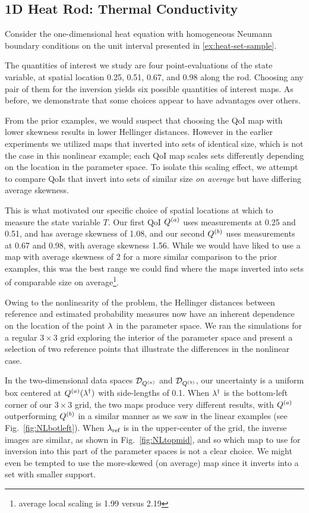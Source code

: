 \subsection{1D Heat Rod: Thermal Conductivity}\label{ex:heat-set-sample-accuracy}

Consider the one-dimensional heat equation with homogeneous Neumann boundary conditions on the unit interval presented in \ref{ex:heat-set-sample}.


The quantities of interest we study are four point-evaluations of the state variable, at spatial location 0.25, 0.51, 0.67, and 0.98 along the rod.
Choosing any pair of them for the inversion yields six possible quantities of interest maps.
As before, we demonstrate that some choices appear to have advantages over others.

From the prior examples, we would suspect that choosing the QoI map with lower skewness results in lower Hellinger distances.
However in the earlier experiments we utilized maps that inverted into sets of identical size, which is not the case in this nonlinear example; each QoI map scales sets differently depending on the location in the parameter space.
To isolate this scaling effect, we attempt to compare QoIs that invert into sets of similar size \emph{on average} but have differing average skewness.

This is what motivated our specific choice of spatial locations at which to measure the state variable $T$.
Our first QoI $Q^{(a)}$ uses measurements at 0.25 and 0.51, and has average skewness of 1.08, and our second $Q^{(b)}$ uses measurements at 0.67 and 0.98, with average skewness 1.56.
While we would have liked to use a map with average skewness of 2 for a more similar comparison to the prior examples, this was the best range we could find where the maps inverted into sets of comparable size on average\footnote{average local scaling is 1.99 versus 2.19}.

Owing to the nonlinearity of the problem, the Hellinger distances between reference and estimated probability measures now have an inherent dependence on the location of the point $\lambda$ in the parameter space.
We ran the simulations for a regular $3\times3$ grid exploring the interior of the parameter space and present a selection of two reference points that illustrate the differences in the nonlinear case.

In the two-dimensional data spaces $\mathcal{D}_{Q^{(a)}}$ and $\mathcal{D}_{Q^{(b)}}$, our uncertainty is a uniform box centered at $Q^{(a)}(\lambda^\dagger)$ with side-lengths of 0.1.
When $\lambda^\dagger$ is the bottom-left corner of our $3\times3$ grid, the two maps produce very different results, with $Q^{(a)}$ outperforming $Q^{(b)}$ in a similar manner as we saw in the linear examples (see Fig.~\ref{fig:NLbotleft}).
When $\lambda_{\text{ref}}$ is in the upper-center of the grid, the inverse images are similar, as shown in Fig.~\ref{fig:NLtopmid}, and so which map to use for inversion into this part of the parameter spaces is not a clear choice. We might even be tempted to use the more-skewed (on average) map since it inverts into a set with smaller support.


